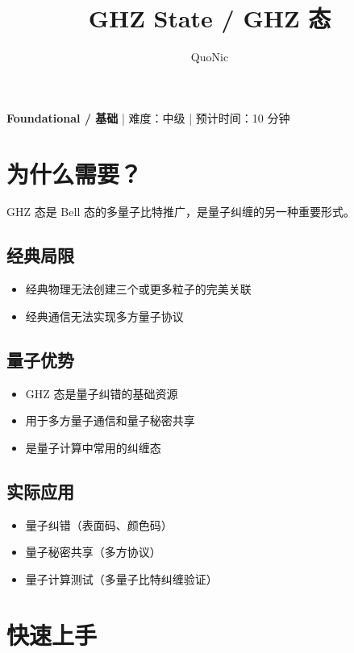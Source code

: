 \documentclass[12pt,a4paper]{article}
\title{GHZ State / GHZ 态}
\author{QuoNic}
\date{}
\begin{document}
\maketitle

\begin{center}
\textbf{Foundational / 基础} | 难度：中级 | 预计时间：10 分钟
\end{center}

\tableofcontents
\newpage

\section{为什么需要？}

GHZ 态是 Bell 态的多量子比特推广，是量子纠缠的另一种重要形式。

\subsection{经典局限}
\begin{itemize}
  \item 经典物理无法创建三个或更多粒子的完美关联
  \item 经典通信无法实现多方量子协议
\end{itemize}

\subsection{量子优势}
\begin{itemize}
  \item GHZ 态是量子纠错的基础资源
  \item 用于多方量子通信和量子秘密共享
  \item 是量子计算中常用的纠缠态
\end{itemize}

\subsection{实际应用}
\begin{itemize}
  \item 量子纠错（表面码、颜色码）
  \item 量子秘密共享（多方协议）
  \item 量子计算测试（多量子比特纠缠验证）
\end{itemize}

\section{快速上手}
\end{document}

